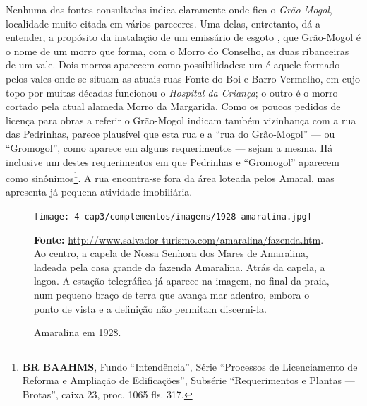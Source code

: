 Nenhuma das fontes consultadas indica claramente onde fica o \textit{Grão Mogol}, localidade muito citada em vários pareceres. Uma delas, entretanto, dá a entender, a propósito da instalação de um emissário de esgoto \cite{bahia_rpe_1895}, que Grão-Mogol é o nome de um morro que forma, com o Morro do Conselho, as duas ribanceiras de um vale. Dois morros aparecem como possibilidades: um é aquele formado pelos vales onde se situam as atuais ruas Fonte do Boi e Barro Vermelho, em cujo topo por muitas décadas funcionou o \textit{Hospital da Criança}; o outro é o morro cortado pela atual alameda Morro da Margarida. Como os poucos pedidos de licença para obras a referir o Grão-Mogol indicam também vizinhança com a rua das Pedrinhas, parece plausível que esta rua e a ``rua do Grão-Mogol'' --- ou ``Gromogol'', como aparece em alguns requerimentos --- sejam a mesma. Há inclusive um destes requerimentos em que Pedrinhas e ``Gromogol'' aparecem como sinônimos\footnote{\textbf{BR BAAHMS}, Fundo ``Intendência'', Série ``Processos de Licenciamento de Reforma e Ampliação de Edificações'', Subsérie ``Requerimentos e Plantas --- Brotas'', caixa 23, proc. 1065 fls. 317.}. A rua encontra-se fora da área loteada pelos Amaral, mas apresenta já pequena atividade imobiliária.

\begin{figure}[!htp]
\centering
\caption{Amaralina em 1928.}
\texttt{[image: 4-cap3/complementos/imagens/1928-amaralina.jpg]}{\par \footnotesize \textbf{Fonte:} \url{http://www.salvador-turismo.com/amaralina/fazenda.htm}. Ao centro, a capela de Nossa Senhora dos Mares de Amaralina, ladeada pela casa grande da fazenda Amaralina. Atrás da capela, a lagoa. A estação telegráfica já aparece na imagem, no final da praia, num pequeno braço de terra que avança mar adentro, embora o ponto de vista e a definição não permitam discerni-la.}
\label{fig:amaralina1928}
\end{figure}


